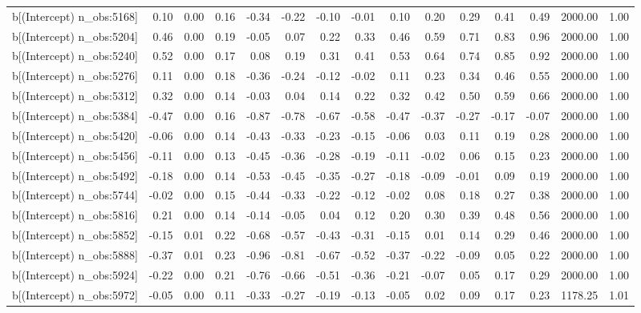 \begin{table}[ht]
\begin{tabular}{rrrrrrrrrrrrrrr}
  b[(Intercept) n\_obs:5168] & 0.10 & 0.00 & 0.16 & -0.34 & -0.22 & -0.10 & -0.01 & 0.10 & 0.20 & 0.29 & 0.41 & 0.49 & 2000.00 & 1.00 \\ 
  b[(Intercept) n\_obs:5204] & 0.46 & 0.00 & 0.19 & -0.05 & 0.07 & 0.22 & 0.33 & 0.46 & 0.59 & 0.71 & 0.83 & 0.96 & 2000.00 & 1.00 \\ 
  b[(Intercept) n\_obs:5240] & 0.52 & 0.00 & 0.17 & 0.08 & 0.19 & 0.31 & 0.41 & 0.53 & 0.64 & 0.74 & 0.85 & 0.92 & 2000.00 & 1.00 \\ 
  b[(Intercept) n\_obs:5276] & 0.11 & 0.00 & 0.18 & -0.36 & -0.24 & -0.12 & -0.02 & 0.11 & 0.23 & 0.34 & 0.46 & 0.55 & 2000.00 & 1.00 \\ 
  b[(Intercept) n\_obs:5312] & 0.32 & 0.00 & 0.14 & -0.03 & 0.04 & 0.14 & 0.22 & 0.32 & 0.42 & 0.50 & 0.59 & 0.66 & 2000.00 & 1.00 \\ 
  b[(Intercept) n\_obs:5384] & -0.47 & 0.00 & 0.16 & -0.87 & -0.78 & -0.67 & -0.58 & -0.47 & -0.37 & -0.27 & -0.17 & -0.07 & 2000.00 & 1.00 \\ 
  b[(Intercept) n\_obs:5420] & -0.06 & 0.00 & 0.14 & -0.43 & -0.33 & -0.23 & -0.15 & -0.06 & 0.03 & 0.11 & 0.19 & 0.28 & 2000.00 & 1.00 \\ 
  b[(Intercept) n\_obs:5456] & -0.11 & 0.00 & 0.13 & -0.45 & -0.36 & -0.28 & -0.19 & -0.11 & -0.02 & 0.06 & 0.15 & 0.23 & 2000.00 & 1.00 \\ 
  b[(Intercept) n\_obs:5492] & -0.18 & 0.00 & 0.14 & -0.53 & -0.45 & -0.35 & -0.27 & -0.18 & -0.09 & -0.01 & 0.09 & 0.19 & 2000.00 & 1.00 \\ 
  b[(Intercept) n\_obs:5744] & -0.02 & 0.00 & 0.15 & -0.44 & -0.33 & -0.22 & -0.12 & -0.02 & 0.08 & 0.18 & 0.27 & 0.38 & 2000.00 & 1.00 \\ 
  b[(Intercept) n\_obs:5816] & 0.21 & 0.00 & 0.14 & -0.14 & -0.05 & 0.04 & 0.12 & 0.20 & 0.30 & 0.39 & 0.48 & 0.56 & 2000.00 & 1.00 \\ 
  b[(Intercept) n\_obs:5852] & -0.15 & 0.01 & 0.22 & -0.68 & -0.57 & -0.43 & -0.31 & -0.15 & 0.01 & 0.14 & 0.29 & 0.46 & 2000.00 & 1.00 \\ 
  b[(Intercept) n\_obs:5888] & -0.37 & 0.01 & 0.23 & -0.96 & -0.81 & -0.67 & -0.52 & -0.37 & -0.22 & -0.09 & 0.05 & 0.22 & 2000.00 & 1.00 \\ 
  b[(Intercept) n\_obs:5924] & -0.22 & 0.00 & 0.21 & -0.76 & -0.66 & -0.51 & -0.36 & -0.21 & -0.07 & 0.05 & 0.17 & 0.29 & 2000.00 & 1.00 \\ 
  b[(Intercept) n\_obs:5972] & -0.05 & 0.00 & 0.11 & -0.33 & -0.27 & -0.19 & -0.13 & -0.05 & 0.02 & 0.09 & 0.17 & 0.23 & 1178.25 & 1.01 \\ 

\end{tabular}
\end{table}

